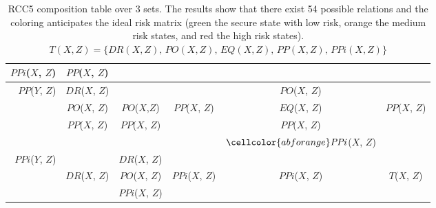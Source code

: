 \begin{table}[t]
\begin{adjustbox}{width=\textwidth}
\begin{tabular}{r||c|c|c|c|c}
	\cellcolor{abforange} $\mathit{PPi}$($\mathit{X}$, $\mathit{Z}$) & 
	\cellcolor{abfred}$\mathit{PP}$($\mathit{X}$, $\mathit{Z}$) \\
\hline
 \multirow{4}{*}{$\mathit{PP}$($\mathit{Y}$, $\mathit{Z}$)} &
	\cellcolor{abfred}$\mathit{DR}$($\mathit{X}$, $\mathit{Z}$) & 
	\cellcolor{abforange}&
	\cellcolor{abforange}&
	\cellcolor{abforange}$\mathit{PO}$($\mathit{X}$, $\mathit{Z}$) &
	\cellcolor{abfred}\\
 & \cellcolor{abfred}$\mathit{PO}$($\mathit{X}$, $\mathit{Z}$) & 
	\cellcolor{abforange}$\mathit{PO}$($\mathit{X}$,$\mathit{Z}$) & 
	\cellcolor{abforange}$\mathit{PP}$($\mathit{X}$, $\mathit{Z}$)& 
	\cellcolor{abforange}$\mathit{EQ}$($\mathit{X}$, $\mathit{Z}$) & 
	\cellcolor{abfred}$\mathit{PP}$($\mathit{X}$, $\mathit{Z}$)\\
 & \cellcolor{abfred}$\mathit{PP}$($\mathit{X}$, $\mathit{Z}$) & 
	\cellcolor{abforange}$\mathit{PP}$($\mathit{X}$, $\mathit{Z}$) & 
	\cellcolor{abforange}& 
	\cellcolor{abforange}$\mathit{PP}$($\mathit{X}$, $\mathit{Z}$) & 
	\cellcolor{abfred}\\
 & \cellcolor{abfred}&\cellcolor{abforange} & \cellcolor{abforange}& $\cellcolor{abforange}\mathit{PPi}$($\mathit{X}$, $\mathit{Z}$) & \cellcolor{abfred}\\
\hline
 \multirow{3}{*}{$\mathit{PPi}$($\mathit{Y}$, $\mathit{Z}$)} &
 \cellcolor{abfred}\multirow{3}{*}{} &
 \cellcolor{abfred}$\mathit{DR}$($\mathit{X}$, $\mathit{Z}$) &
 \cellcolor{abfred} &
 \cellcolor{abfred}&
 \cellcolor{abfred}\\
& \cellcolor{abfred}$\mathit{DR}$($\mathit{X}$, $\mathit{Z}$) &
 \cellcolor{abfred}$\mathit{PO}$($\mathit{X}$, $\mathit{Z}$) & 
 \cellcolor{abfred}$\mathit{PPi}$($\mathit{X}$, $\mathit{Z}$)& 
 \cellcolor{abfred}$\mathit{PPi}$($\mathit{X}$, $\mathit{Z}$)& 
 \cellcolor{abfred}$\mathit{T}$($\mathit{X}$, $\mathit{Z}$)\\
&\cellcolor{abfred} & \cellcolor{abfred}$\mathit{PPi}$($\mathit{X}$, $\mathit{Z}$) & \cellcolor{abfred}& \cellcolor{abfred}&\cellcolor{abfred} 
\end{tabular}
\end{adjustbox}
\caption{RCC5 composition table over 3 sets. The results show that there exist 54 possible relations and the coloring anticipates the ideal risk matrix (green the secure state with low risk, orange the medium risk states, and red the high risk states). $\mathit{T}(\mathit{X},\mathit{Z}) = \{\mathit{DR}(\mathit{X}, \mathit{Z}), \, \mathit{PO}(\mathit{X},\mathit{Z}),\, \mathit{EQ}(\mathit{X},\mathit{Z}),\, \mathit{PP}(\mathit{X},\mathit{Z}),\, \mathit{PPi}(\mathit{X},\mathit{Z})\}$\label{tab:5com}}
\end{table}

